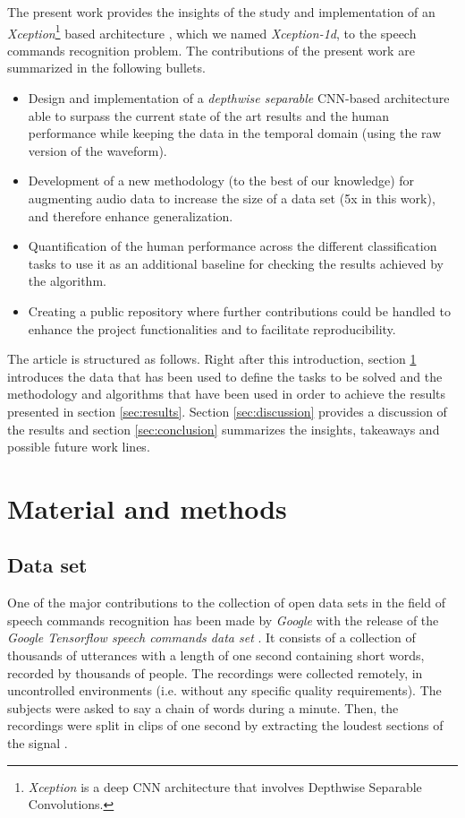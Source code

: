 The present work provides the insights of the study and implementation of an \textit{Xception}\footnote{\textit{Xception} is a deep CNN architecture that involves Depthwise Separable Convolutions.} based architecture \autocite{chollet2017}, which we named \textit{Xception-1d}, to the speech commands recognition problem.  The contributions of the present work are summarized in the following bullets.

 \begin{itemize}
 	\item Design and implementation of a \textit{depthwise separable} CNN-based architecture able to surpass the current state of the art results and the human performance while keeping the data in the temporal domain (using the raw version of the waveform).

 	\item Development of a new methodology (to the best of our knowledge) for augmenting audio data to increase the size of a data set (5x in this work), and therefore enhance generalization.

 	\item Quantification of the human performance across the different classification tasks to use it as an additional baseline for checking the results achieved by the algorithm.

	\item Creating a public repository where further contributions could be handled to enhance the project functionalities and to facilitate reproducibility.
 \end{itemize}

 The article is structured as follows. Right after this introduction, section \ref{sec:MM} introduces the data that has been used to define the tasks to be solved and the methodology and algorithms that have been used in order to achieve the results presented in section \ref{sec:results}. Section \ref{sec:discussion} provides a discussion of the results and section \ref{sec:conclusion} summarizes the insights, takeaways and possible future work lines.

 \section{Material and methods} \label{sec:MM}

\subsection{Data set}
One of the major contributions to the collection of open data sets in the field of speech commands recognition has been made by \textit{Google} with the release of the \textit{Google Tensorflow speech commands data set} \autocite{speechcommands, Warden2018}. It consists of a collection of thousands of utterances with a length of one second containing short words, recorded by thousands of people. The recordings were collected remotely, in uncontrolled environments (i.e. without any specific quality requirements). The subjects were asked to say a chain of words during a minute. Then, the recordings were split in clips of one second by extracting the loudest sections of the signal \autocite{speechcommands, Warden2018}.

